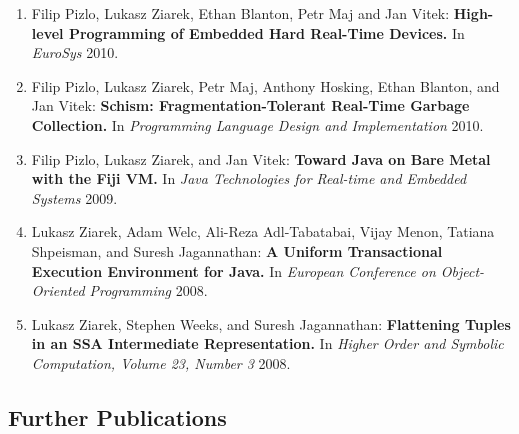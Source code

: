 \documentclass[times,11pt]{article}
\begin{document}
\noindent
\begin{enumerate}\setlength{\itemsep}{\myspace}



\item Filip Pizlo, Lukasz Ziarek, Ethan Blanton, Petr Maj and Jan Vitek:
{\bf High-level Programming of Embedded Hard Real-Time Devices.}
In \emph{EuroSys} 2010.

\item Filip Pizlo, Lukasz Ziarek, Petr Maj, Anthony Hosking, Ethan Blanton, and Jan Vitek:
{\bf Schism: Fragmentation-Tolerant Real-Time Garbage Collection.}
In \emph{Programming Language Design and Implementation} 2010.


\item Filip Pizlo, Lukasz Ziarek, and Jan Vitek:
{\bf Toward Java on Bare Metal with the Fiji VM.}
In \emph{Java Technologies for Real-time and Embedded Systems} 2009.

\item Lukasz Ziarek, Adam Welc, Ali-Reza Adl-Tabatabai, Vijay Menon, 
Tatiana Shpeisman, and Suresh Jagannathan:
{\bf A Uniform Transactional Execution Environment for Java.} 
In \emph{European Conference on Object-Oriented Programming} 2008.  

\item Lukasz Ziarek, Stephen Weeks, and Suresh Jagannathan:
{\bf Flattening Tuples in an SSA Intermediate Representation.}
In \emph{Higher Order and Symbolic Computation, Volume 23, Number 3} 2008.

\end{enumerate}


\subsection*{Further Publications}
\end{document}
